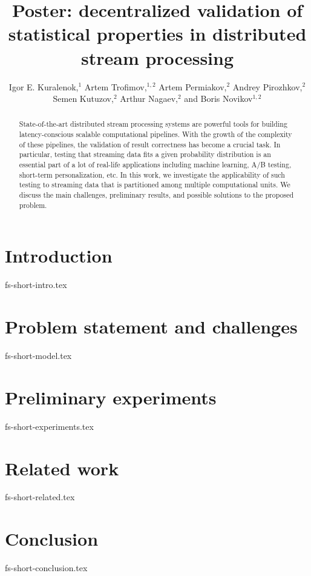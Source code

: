 \documentclass[sigconf]{acmart}
\theoremstyle{remark}
\begin{document}

\title {Poster: decentralized validation of statistical properties in distributed stream processing}

\author{  Igor E. Kuralenok,$^1$     Artem Trofimov,$^ {1,2}$    Artem Permiakov,$^ {2}$   Andrey Pirozhkov,$^ {2}$    Semen Kutuzov,$^ {2}$     Arthur Nagaev,$^ {2}$    and  Boris Novikov$^ {1,2}$ }

\begin{abstract}
State-of-the-art distributed stream processing systems are powerful tools for building latency-conscious scalable computational pipelines. With the growth of the complexity of these pipelines, the validation of result correctness has become a crucial task. In particular, testing that streaming data fits a given probability distribution is an essential part of a lot of real-life applications including machine learning, A/B testing, short-term personalization, etc. In this work, we investigate the applicability of such testing to streaming data that is partitioned among multiple computational units. We discuss the main challenges, preliminary results, and possible solutions to the proposed problem.
\end{abstract}


\maketitle

\thispagestyle{empty}

\section {Introduction}
 {fs-short-intro.tex}


\section {Problem statement and challenges}
 {fs-short-model.tex}

\section {Preliminary experiments}
 {fs-short-experiments.tex}

\section {Related work}
 {fs-short-related.tex}

\section {Conclusion}
 {fs-short-conclusion.tex}



\end{document}

